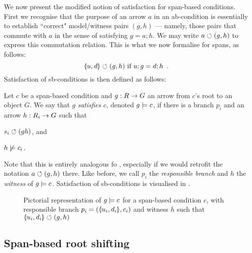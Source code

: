 \medskip\noindent We now present the modified notion of satisfaction for span-based conditions. First we recognise that the purpose of an arrow $a$ in an ab-condition is essentially to establish ``correct" model/witness pairs $(g,h)$ --- namely, those pairs that commute with $a$ in the sense of satisfying $g=a;h$. We may write $a\circlearrowleft (g,h)$ to express this commutation relation. This is what we now formalise for spans, as follows:
\[ \spanof u d \commutes (g,h) \text{ if } u;g=d;h \enspace. \]
Satisfaction of sb-conditions is then defined as follows:

\begin{definition}
  Let $c$ be a span-based condition and $g:R\rightarrow G$ an arrow from $c$'s root to an object $G$. We say that \emph{$g$ satisfies $c$}, denoted $g\models c$, if there is a branch $p_i$ and an arrow $h:R_i\rightarrow G$ such that
  \begin{enumerate*}
  \item $s_i \circlearrowleft (g h)$, and
  \item $h\not\models c_i$.
  \end{enumerate*}
\end{definition}
%
Note that this is entirely analogous fo , especially if we would retrofit the notation $a\circlearrowleft (g,h)$ there. Like before, we call $p_i$ the \emph{responsible branch} and $h$ the \emph{witness} of $g\models c$. Satisfaction of sb-conditions is visualised in .
%
\begin{figure}
  \centering
  
  \caption{Pictorial representation of $g\models c$ for a span-based condition $c$, with responsible branch $p_i=(\spanof{u_i}{d_i},c_i)$ and witness $h$ such that $\spanof{u_i}{d_i}\commutes (g,h)$}
\end{figure}

\subsection{Span-based root shifting}

